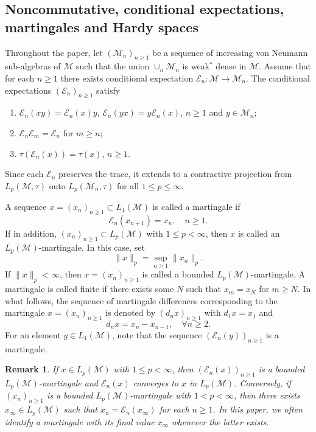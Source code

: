\documentclass[11]{amsart}
\numberwithin{equation}{section}
\newtheorem{remark}[theorem]{Remark}
\newcommand{\M}{\mathcal{M}}
\begin{document}
\subsection{Noncommutative, conditional expectations, martingales and Hardy spaces}\label{sec-mart}
Throughout the paper, let $(\mathcal{M}_n)_{n\geq1}$ be a sequence of  increasing von Neumann sub-algebras of $\mathcal{M}$ such that the union $\cup_n\mathcal{M}_n$ is weak$^*$ dense in $\mathcal{M}$.
Assume that for each $n\geq1$ there exists conditional expectation $\mathcal{E}_n:\mathcal{M}\to\mathcal{M}_n$. 
The conditional expectations $(\mathcal{E}_{n})_{n\geq1}$ satisfy
\begin{enumerate}[{\rm (a)}]
	\item $\mathcal{E}_{n}(xy)=\mathcal{E}_{n}(x)y$, $\mathcal{E}_n(yx)=y\mathcal{E}_{n}(x)$, $n\geq1$ and $y\in \mathcal{M}_n$;
	\item $\mathcal{E}_n\mathcal{E}_m=\mathcal{E}_n$ for $m\geq n$;
	\item $\tau(\mathcal{E}_n(x))=\tau(x)$, $n\geq1$.
\end{enumerate}
Since each $\mathcal{E}_n$ preserves the trace, it extends to a contractive projection from $L_p(\mathcal{M},\tau)$ onto $L_p(\mathcal{M}_n,\tau)$ for all $1\leq p\leq \infty.$


A sequence $x=(x_n)_{n\geq1}\subset L_1(\mathcal{M})$ is called a martingale if
$$\mathcal{E}_{n}(x_{n+1})=x_n,\quad n\geq1.$$
If in addition, $(x_n)_{n\geq1}\subset L_p(\mathcal{M})$ with $1\leq p<\infty$, then $x$ is called an $L_p(\M)$-martingale. In this case, set 
\begin{equation}\label{def martingale}
\|x\|_p=\sup_{n\geq1}\|x_n\|_p.
\end{equation}
If $\|x\|_p<\infty$, then $x=(x_n)_{n\geq1}$ is called a bounded $L_p(\M)$-martingale.
A martingale is called finite if there exists some $N$ such that $x_m=x_N$ for $m\geq N$. In what follows, the sequence of martingale differences  corresponding to the martingale $x=(x_n)_{n\geq1}$ is denoted by $(d_nx)_{n\geq1}$
with $d_1x=x_1$ and
\begin{equation}\label{m-dif}
	d_nx=x_n-x_{n-1},\quad \forall n\geq2.
\end{equation}
For an element $y\in L_1(\mathcal{M})$, note that the sequence $(\mathcal{E}_n(y))_{n\geq1}$ is a  martingale.

\begin{remark}\label{rem: martingale}
	If $x\in L_p(\mathcal{M})$ with $1\leq p<\infty$, then $(\mathcal{E}_n(x))_{n\geq1}$ is a bounded $L_p(\M)$-martingale and $\mathcal{E}_n(x)$ converges to $x$ in $L_p(\mathcal{M})$. Conversely, if $(x_n)_{n\geq1}$ is a bounded $L_p(\M)$-martingale with $1<p<\infty$, then there exists $x_{\infty}\in L_p(\mathcal{M})$ such that $x_n=\mathcal{E}_n(x_{\infty})$ for each $n\geq1$. In this paper, we often  identify a martingale with its final value $x_{\infty}$ whenever the latter exists.
\end{remark}
\end{document}
